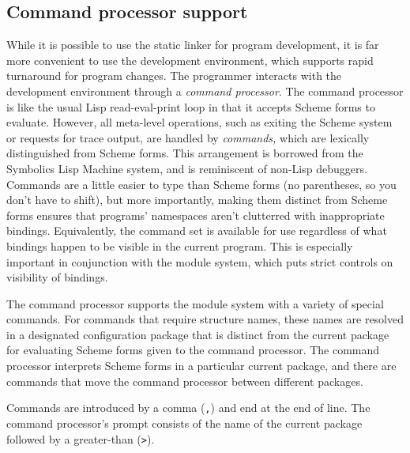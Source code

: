 \subsection*{Command processor support}

While it is possible to use the \hack{} static linker for program
development, it is far more convenient to use the development
environment, which supports rapid turnaround for program changes.  The
programmer interacts with the development environment through a {\em
command processor}.  The command processor is like the usual Lisp
read-eval-print loop in that it accepts Scheme forms to evaluate.
However, all meta-level operations, such as exiting the Scheme system
or requests for trace output, are handled by {\em commands,} which are
lexically distinguished from Scheme forms.  This arrangement is
borrowed from the Symbolics Lisp Machine system, and is reminiscent of
non-Lisp debuggers.  Commands are a little easier to type than Scheme
forms (no parentheses, so you don't have to shift), but more
importantly, making them distinct from Scheme forms ensures that
programs' namespaces aren't clutterred with inappropriate bindings.
Equivalently, the command set is available for use regardless of what
bindings happen to be visible in the current program.  This is
especially important in conjunction with the module system, which puts
strict controls on visibility of bindings.

The \hack{} command processor supports the module system with a
variety of special commands.  For commands that require structure
names, these names are resolved in a designated configuration package
that is distinct from the current package for evaluating Scheme forms
given to the command processor.  The command processor interprets
Scheme forms in a particular current package, and there are commands
that move the command processor between different packages.

Commands are introduced by a comma ({\tt,}) and end at the end of
line.  The command processor's prompt consists of the name of the
current package followed by a greater-than ({\tt>}).

